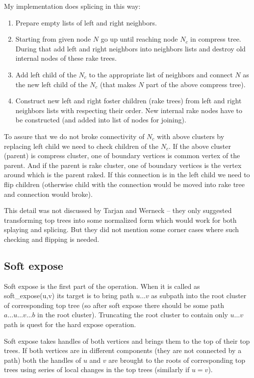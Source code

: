 My implementation does splicing in this way:
\begin{enumerate}
\item Prepare empty lists of left and right neighbors.
\item Starting from given node $N$ go up until reaching node $N_c$ in compress
tree. During that add left and right neighbors into neighbors lists and destroy
old internal nodes of these rake trees.
\item Add left child of the $N_c$ to the appropriate list of neighbors and
connect $N$ as the new left child of the $N_c$ (that makes $N$ part of the above
compress tree).
\item Construct new left and right foster children (rake trees) from left and
right neighbors lists with respecting their order. New internal rake nodes have
to be constructed (and added into list of nodes for joining).
\end{enumerate}

To assure that we do not broke connectivity of $N_c$ with above clusters by
replacing left child we need to check children of the $N_c$. If the above
cluster (parent) is compress cluster, one of boundary vertices is common vertex
of the parent. And if the parent is rake cluster, one of boundary vertices is
the vertex around which is the parent raked. If this connection is in the left
child we need to flip children (otherwise child with the connection would be
moved into rake tree and connection would broke).

This detail was not discussed by Tarjan and Werneck -- they only suggested
transforming top trees into some normalized form which would work for both
splaying and splicing. But they did not mention some corner cases where such
checking and flipping is needed.

\subsection{Soft expose}

Soft expose is the first part of the \Expose{} operation. When it is called as
{\I soft\_expose(u,v)} its target is to bring path $u\dots v$ as subpath into
the root cluster of corresponding top tree (so after soft expose there should
be some path $a\dots u\dots v\dots b$ in the root cluster). Truncating the root
cluster to contain only $u\dots v$ path is quest for the hard expose operation.

Soft expose takes handles of both vertices and brings them to the top of their
top trees. If both vertices are in different components (they are not connected
by a path) both the handles of $u$ and $v$ are brought to the roots of
corresponding top trees using series of local changes in the top trees
(similarly if $u=v$).

